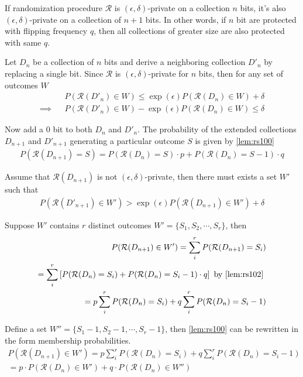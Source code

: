 \documentclass[11pt]{article}
\newcommand{\cR}{\mathcal{R}}
\begin{document}
 \begin{lem} \label{lem:rs2}
 If randomization procedure $\cR$ is $(\epsilon, \delta)$-private on a collection $n$ bits, it's also $(\epsilon, \delta)$-private on a collection of $n+1$ bits.  In other words, if $n$ bit are protected with flipping frequency $q$, then all collections of greater size are also protected with same $q$. 
\end{lem}
\begin{pf}
Let $D_n$ be a collection of $n$ bits and derive a neighboring collection $D'_n$ by replacing a single bit.  Since $\cR$ is $(\epsilon, \delta)$-private for $n$ bits, then for any set of outcomes $W$
\begin{align}\label{lem:rs101}
 && P(\cR(D'_n) \in W) \le \exp(\epsilon)P(\cR(D_n) \in W) + \delta \\
 \implies && P(\cR(D'_n) \in W) - \exp(\epsilon)P(\cR(D_n) \in W) \le \delta
\end{align}
 
 Now add a 0 bit to both $D_n$ and $D'_n$.  The probability of the extended collections $D_{n+1}$ and $D'_{n+1}$ generating a particular outcome $S$ is given by  \eqref{lem:rs100}
 \begin{align}\label{lem:rs102}
P(\cR(D_{n+1}) = S) = P(\cR(D_n)=S) \cdot p + P(\cR(D_n)=S-1) \cdot q
\end{align}

Assume that $\cR(D_{n+1})$ is not $(\epsilon, \delta)$-private, then there must exists a set $W'$ such that 
\begin{align}\label{lem:rs103}
P(\cR(D'_{n+1}) \in W') > \exp(\epsilon)P(\cR(D_{n+1}) \in W') + \delta
\end{align}
 
Suppose $W'$ contains $r$ distinct outcomes $W'=\{S_1, S_2, \cdots, S_r\}$, then
\begin{align}
P(\cR(D_{n+1}) \in W') = \sum_i^r P( \cR(D_{n+1})  = S_i) \\
=  \sum_i^r \left [ P( \cR(D_{n})  = S_i) + P(\cR(D_n)=S_i-1) \cdot q \right ]  \text{ by  \eqref{lem:rs102} } \\
= p \sum_i^r P( \cR(D_{n})  = S_i)  + q \sum_i^r  P( \cR(D_{n})  = S_i - 1)  \label{lem:rs103}
\end{align}
 
 Define a set $W'' = \{S_1 - 1, S_2 - 1, \cdots, S_r - 1\}$, then \eqref{lem:rs100} can be rewritten in the form membership probabilities.  
 \begin{align}
P(\cR(D_{n+1}) \in W') = p \sum_i^r P( \cR(D_{n})  = S_i)  + q \sum_i^r  P( \cR(D_{n})  = S_i - 1) \\
= p \cdot P(\cR(D_n) \in W') + q \cdot P(\cR(D_n) \in W'')
\end{align}


\end{pf}
\end{document}
